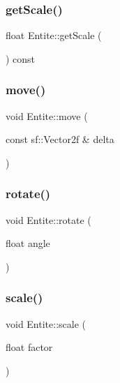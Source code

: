 \mbox{\label{class_entite_a95d64960088b9576b94346acd5ad6296}} 
\subsubsection{\texorpdfstring{get\+Scale()}{getScale()}}
{\footnotesize\ttfamily float Entite\+::get\+Scale (\begin{DoxyParamCaption}{ }\end{DoxyParamCaption}) const}

\mbox{\label{class_entite_a6d77bd5ad9eaf7e7150a4e96448043ec}} 
\subsubsection{\texorpdfstring{move()}{move()}}
{\footnotesize\ttfamily void Entite\+::move (\begin{DoxyParamCaption}\item[{const sf\+::\+Vector2f \&}]{delta }\end{DoxyParamCaption})}

\mbox{\label{class_entite_a620502288a6a0fc619eb4cab0fbe2289}} 
\subsubsection{\texorpdfstring{rotate()}{rotate()}}
{\footnotesize\ttfamily void Entite\+::rotate (\begin{DoxyParamCaption}\item[{float}]{angle }\end{DoxyParamCaption})}

\mbox{\label{class_entite_a08e80693f0b1293f5a0ab9d04a5aac0e}} 
\subsubsection{\texorpdfstring{scale()}{scale()}}
{\footnotesize\ttfamily void Entite\+::scale (\begin{DoxyParamCaption}\item[{float}]{factor }\end{DoxyParamCaption})}

